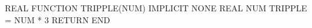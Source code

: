 \documentclass{book}
\begin{document}
\begin{verbatim*}
REAL FUNCTION TRIPPLE(NUM)
IMPLICIT NONE
        REAL NUM
        TRIPPLE = NUM * 3
        RETURN
END
\end{verbatim*}
\end{document}

